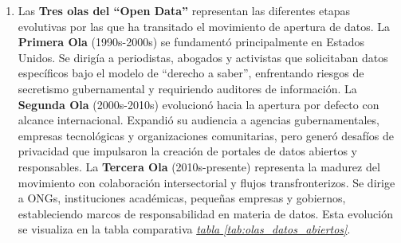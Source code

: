 \begin{enumerate}
	La materialización de esta filosofía de apertura se concreta en requisitos técnicos y jurídicos específicos, cuya interpretación puede variar ligeramente entre las entidades que los definen. Desde el Grupo de Trabajo sobre Datos Abiertos de la \textit{Open Knowledge Foundation} (OKF), ``el conocimiento está abierto si alguien tiene la libertad de acceder a él, usarlo, modificarlo y compartirlo, sujeto, como máximo, a medidas que preserven su procedencia y su apertura'' \citep{OpenKnowledgeFoundation}. El Portal Europeo de Datos y el \textit{Open Data Charter}, por su parte, enfatizan las condiciones de acceso y las libertades de uso, incluyendo la gratuidad y la ausencia de limitaciones. Detallan la necesidad de características técnicas y jurídicas para que los datos sean libremente reutilizables y redistribuibles \citep{dataEuropaOpenData, Open_Data_Charter}.
	Todo esto subraya la complejidad y la multifuncionalidad de los Datos Abiertos como catalizador para la innovación y el desarrollo socioeconómico. Tienen implicaciones legales y técnicas que deben ser gestionadas cuidadosamente para maximizar su potencial.

	\item Las \textbf{Tres olas del ``Open Data''} \label{def5} representan las diferentes etapas evolutivas por las que ha transitado el movimiento de apertura de datos.
	La \textbf{Primera Ola} (1990s-2000s) se fundamentó principalmente en Estados Unidos. Se dirigía a periodistas, abogados y activistas que solicitaban datos específicos bajo el modelo de ``derecho a saber'', enfrentando riesgos de secretismo gubernamental y requiriendo auditores de información.
	La \textbf{Segunda Ola} (2000s-2010s) evolucionó hacia la apertura por defecto con alcance internacional. Expandió su audiencia a agencias gubernamentales, empresas tecnológicas y organizaciones comunitarias, pero generó desafíos de privacidad que impulsaron la creación de portales de datos abiertos y responsables.
	La \textbf{Tercera Ola} (2010s-presente) representa la madurez del movimiento con colaboración intersectorial y flujos transfronterizos. Se dirige a ONGs, instituciones académicas, pequeñas empresas y gobiernos, estableciendo marcos de responsabilidad en materia de datos.
	Esta evolución se visualiza en la tabla comparativa \hyperref[tab:olas_datos_abiertos]{\textit{tabla \ref*{tab:olas_datos_abiertos}}}. %


\end{enumerate}
